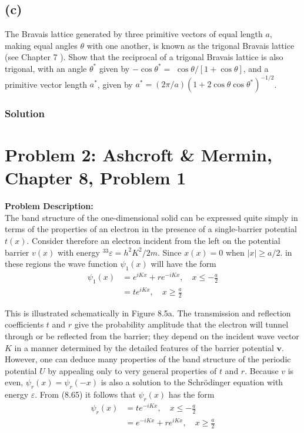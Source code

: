 \documentclass[12pt]{article}
\begin{document}
\subsection{(c)}
 The Bravais lattice generated by three primitive vectors of equal length $a$, making equal angles $\theta$ with one another, is known as the trigonal Bravais lattice (see Chapter 7 ). Show that the reciprocal of a trigonal Bravais lattice is also trigonal, with an angle $\theta^*$ given by $-\cos \theta^*=$ $\cos \theta /[1+\cos \theta]$, and a primitive vector length $a^*$, given by $a^*=(2 \pi / a)\left(1+2 \cos \theta \cos \theta^*\right)^{-1 / 2}$.
\subsubsection{Solution}


\section{Problem 2: Ashcroft \& Mermin, Chapter 8, Problem 1}
\noindent \textbf{Problem Description:} \\
The band structure of the one-dimensional solid can be expressed quite simply in terms of the properties of an electron in the presence of a single-barrier potential $t(x)$. Consider therefore an electron incident from the left on the potential barrier $v(x)$ with energy ${ }^{33} \varepsilon=h^2 K^2 / 2 m$. Since $x(x)=0$ when $|x| \geqslant a / 2$. in these regions the wave function $\psi_1(x)$ will have the form
$$
\begin{aligned}
\psi_1(x) & =e^{i K x}+r e^{-i K x}, \quad x \leqslant-\frac{a}{2} \\
& =t e^{i K x}, \quad x \geqslant \frac{a}{2}
\end{aligned}
$$

This is illustrated schematically in Figure 8.5a.
The transmission and reflection coefficients $t$ and $r$ give the probability amplitude that the electron will tunnel through or be reflected from the barrier; they depend on the incident wave vector $K$ in a manner determined by the detailed features of the barrier potential $\boldsymbol{v}$. However, one can deduce many properties of the band structure of the periodic potential $U$ by appealing only to very general properties of $t$ and $r$. Because $v$ is even, $\psi_r(x)=\psi_r(-x)$ is also a solution to the Schrödinger equation with energy $\varepsilon$. From (8.65) it follows that $\psi_r(x)$ has the form
$$
\begin{aligned}
\psi_r(x) & =t e^{-i K x}, \quad x \leqslant-\frac{a}{2} \\
& =e^{-i K x}+r e^{i K x}, \quad x \geqslant \frac{a}{2}
\end{aligned}
$$
\end{document}
